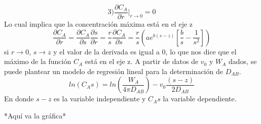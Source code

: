  \begin{equation*}
     3) \frac{\partial C_A}{\partial r}|_{r\rightarrow0}=0
 \end{equation*}
 Lo cual implica que la concentración máxima está en el eje z
 \begin{equation*}
    \frac{\partial C_A}{\partial r}=\frac{\partial C_A}{\partial s}\frac{\partial s}{\partial r}=\frac{r}{s}\frac{\partial C_A}{\partial s}=\frac{r}{s}(ae^{b(s-z)}[\frac{b}{s}-\frac{1}{s^2}])
 \end{equation*}
 si $r\rightarrow0$, $s\rightarrow z$ y el valor de la derivada es igual a 0, lo que nos dice que el máximo de la función $C_A$ está en el eje z.
 A partir de datos de $v_0$ y $W_A$ dados, se puede plantear un modelo de regresión lineal para la determinación de $D_{AB}$.
 \begin{equation*}
     ln(C_As)=ln(\frac{W_A}{4\pi D_{AB}})-v_0\frac{(s-z)}{2D_{AB}}
 \end{equation*}
 En donde $s-z$ es la variable independiente y $C_As$ la variable dependiente.

 *Aquí va la gráfica* %
 
